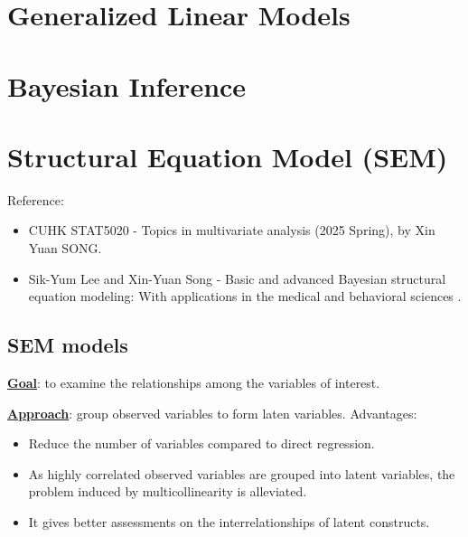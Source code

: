 \documentclass[10pt,a4paper]{book}
\begin{document}
\chapter{Generalized Linear Models}\label{chap:GLM}



\chapter{Bayesian Inference}\label{chap:bayes_inference}



\chapter{Structural Equation Model (SEM)}\label{chap:SEM}
Reference: 
\begin{itemize}
	\item CUHK STAT5020 - Topics in multivariate analysis (2025 Spring), by Xin Yuan SONG.
	\item Sik-Yum Lee and Xin-Yuan Song - Basic and advanced
	Bayesian structural equation modeling: With applications in the
	medical and behavioral sciences \cite{lee2012basic}.
\end{itemize}

\section{SEM models}\label{sec:SEM_models}
\textbf{\underline{Goal}}: to examine the relationships among the variables of interest.

\noindent \textbf{\underline{Approach}}: group observed variables to form laten variables. Advantages:
\begin{itemize}
	\item Reduce the number of variables compared to direct regression.
	\item As highly correlated observed variables are grouped into latent variables, the problem induced by multicollinearity is alleviated.
	\item It gives better assessments on the interrelationships of latent constructs.
\end{itemize}
\end{document}
